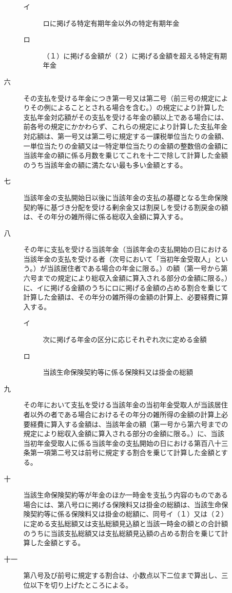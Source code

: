 \documentclass[twocolumn,a4j,10pt]{ltjtarticle}
\begin{document}
\begin{description}
\begin{description}
\begin{description}
\item[イ]ロに掲げる特定有期年金以外の特定有期年金
\item[ロ]（１）に掲げる金額が（２）に掲げる金額を超える特定有期年金
\end{description}
\item[六]その支払を受ける年金につき第一号又は第二号（前三号の規定によりその例によることとされる場合を含む。）の規定により計算した支払年金対応額がその支払を受ける年金の額以上である場合には、前各号の規定にかかわらず、これらの規定により計算した支払年金対応額は、第一号又は第二号に規定する一課税単位当たりの金額、一単位当たりの金額又は一特定単位当たりの金額の整数倍の金額に当該年金の額に係る月数を乗じてこれを十二で除して計算した金額のうち当該年金の額に満たない最も多い金額とする。
\item[七]当該年金の支払開始日以後に当該年金の支払の基礎となる生命保険契約等に基づき分配を受ける剰余金又は割戻しを受ける割戻金の額は、その年分の雑所得に係る総収入金額に算入する。
\item[八]その年に支払を受ける当該年金（当該年金の支払開始の日における当該年金の支払を受ける者（次号において「当初年金受取人」という。）が当該居住者である場合の年金に限る。）の額（第一号から第六号までの規定により総収入金額に算入される部分の金額に限る。）に、イに掲げる金額のうちにロに掲げる金額の占める割合を乗じて計算した金額は、その年分の雑所得の金額の計算上、必要経費に算入する。
\begin{description}
\item[イ]次に掲げる年金の区分に応じそれぞれ次に定める金額
\item[ロ]当該生命保険契約等に係る保険料又は掛金の総額
\end{description}
\item[九]その年において支払を受ける当該年金の当初年金受取人が当該居住者以外の者である場合におけるその年分の雑所得の金額の計算上必要経費に算入する金額は、当該年金の額（第一号から第六号までの規定により総収入金額に算入される部分の金額に限る。）に、当該当初年金受取人に係る当該年金の支払開始の日における第百八十三条第一項第二号又は前号に規定する割合を乗じて計算した金額とする。
\item[十]当該生命保険契約等が年金のほか一時金を支払う内容のものである場合には、第八号ロに掲げる保険料又は掛金の総額は、当該生命保険契約等に係る保険料又は掛金の総額に、同号イ（１）又は（２）に定める支払総額又は支払総額見込額と当該一時金の額との合計額のうちに当該支払総額又は支払総額見込額の占める割合を乗じて計算した金額とする。
\item[十一]第八号及び前号に規定する割合は、小数点以下二位まで算出し、三位以下を切り上げたところによる。

\end{description}
\end{description}
\end{document}
